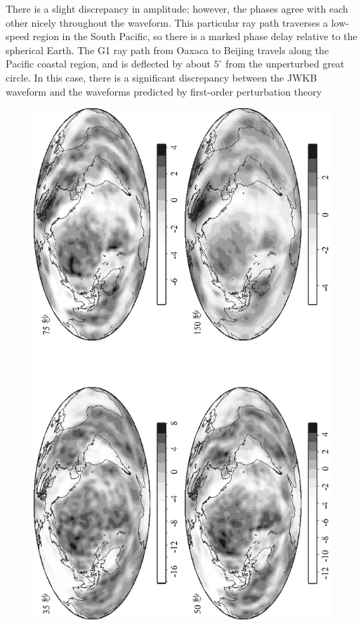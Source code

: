 There is a slight discrepancy in amplitude;
however, the phases agree with each other
nicely throughout the waveform.
This particular ray path traverses a
low-speed region in the South Pacific,
so there is a marked phase delay
relative to the spherical Earth.
The G1 ray path from Oaxaca to Beijing
travels along the Pacific coastal region,
and is deflected by about $5^\circ$ from the unperturbed great circle. 
In this case, there is a significant discrepancy between the JWKB
waveform and the waveforms predicted by first-order perturbation theory
\begin{figure}[!t]
\begin{center}
\includegraphics{../figures/chap16/fig18.eps}

\end{center}
\end{figure}

